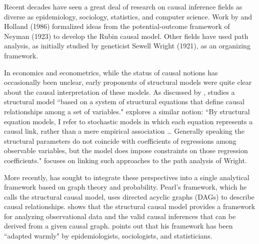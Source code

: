 \documentclass[11pt]{amsart}
\begin{document}
Recent decades have seen a great deal of research on causal inference fields as diverse as epidemiology, sociology, statistics, and computer science. 
Work by \citet{Rubin:1974im,Rubin:1977dv} and Holland (1986) formalized ideas from the potential-outcome framework of Neyman (1923) to develop the Rubin causal model. %
Other fields have used path analysis, as initially studied by geneticist Sewell Wright (1921), as an organizing framework.

In economics and econometrics, while the status of causal notions has occasionally been unclear, early proponents of structural models were quite clear about the causal interpretation of these models.
As discussed by \citet{Heckman:2015ez}, \citet{Haavelmo:1943cl,Haavelmo:1944jq} studies a structural model ``based on a system of structural equations that define causal relationships among a set of variables."
\citep[p. 979]{Goldberger:1972cq} explores a similar notion: ``By structural equation models, I refer to stochastic models in which each equation represents a causal link, rather than a mere empirical association \dots
Generally speaking the structural parameters do not coincide with coefficients of regressions among observable variables, but the model does impose constraints on those regression coefficients."
\citep[p.979]{Goldberger:1972cq} focuses on linking such approaches to the path analysis of Wright.

More recently, \citet{Pearl:2009kh} has sought to integrate these perspectives into a single analytical framework based on graph theory and probability.
Pearl's framework, which he calls the structural causal model, uses directed acyclic graphs (DAGs) to describe causal relationships.
\citet{Pearl:2009kh} shows that the structural causal model provides a framework for analyzing observational data and the valid causal inferences that can be derived from a given causal graph.
\citet[p. 698]{Pearl:2011jd} points out that his framework has been ``adapted warmly" by epidemiologists, sociologists, and statisticians.
\end{document}
